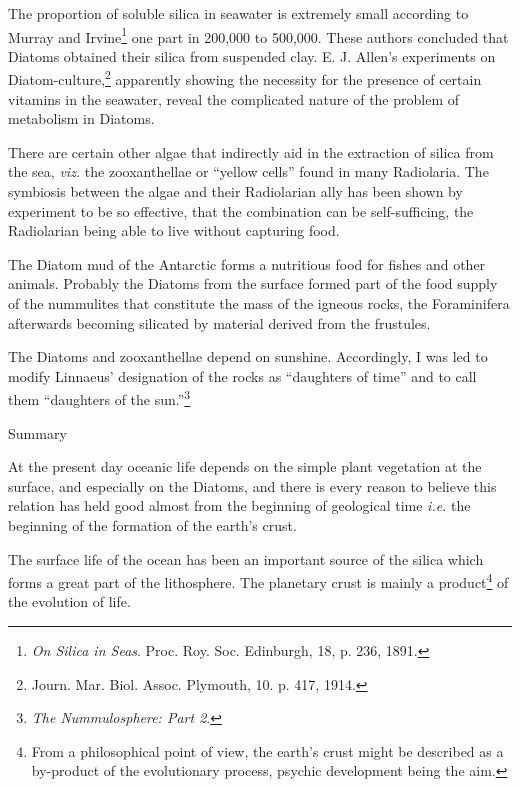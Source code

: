 \documentclass[a4paper, 12pt, oneside, landscape]{article}
\begin{document}
The proportion of soluble silica in seawater is extremely small according to Murray and Irvine\footnote{\emph{On Silica in Seas}. Proc. Roy. Soc. Edinburgh, 18, p. 236, 1891.} one part in 200,000 to 500,000. These authors concluded that Diatoms obtained their silica from suspended clay. E. J. Allen's experiments on Diatom-culture,\footnote{Journ. Mar. Biol. Assoc. Plymouth, 10. p. 417, 1914.} apparently showing the necessity for the presence of certain vitamins in the seawater, reveal the complicated nature of the problem of metabolism in Diatoms.

There are certain other algae that indirectly aid in the extraction of silica from the sea, \emph{viz.} the zooxanthellae or ``yellow cells'' found in many Radiolaria. The symbiosis between the algae and their Radiolarian ally has been shown by experiment to be so effective, that the combination can be self-sufficing, the Radiolarian being able to live without capturing food.

The Diatom mud of the Antarctic forms a nutritious food for fishes and other animals. Probably the Diatoms from the surface formed part of the food supply of the nummulites that constitute the mass of the igneous rocks, the Foraminifera afterwards becoming silicated by material derived from the frustules.

The Diatoms and zooxanthellae depend on sunshine. Accordingly, I was led to modify Linnaeus' designation of the rocks as ``daughters of time'' and to call them ``daughters of the sun.''\footnote{\emph{The Nummulosphere: Part 2}.}

\bigskip
\centerline{Summary} 

At the present day oceanic life depends on the simple plant vegetation at the surface, and especially on the Diatoms, and there is every reason to believe this relation has held good almost from the beginning of geological time \emph{i.e.} the beginning of the formation of the earth's crust.

The surface life of the ocean has been an important source of the silica which forms a great part of the lithosphere. The planetary crust is mainly a product\footnote{From a philosophical point of view, the earth's crust might be described as a by-product of the evolutionary process, psychic development being the aim.} of the evolution of life.
\end{document}
